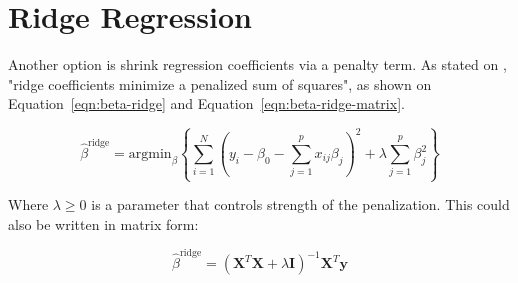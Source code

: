 \section{Ridge Regression}
\label{sec:ridge}

Another option is shrink regression coefficients via a penalty term. As stated on \cite{friedman2001}, "ridge coefficients minimize a penalized sum of squares", as shown on Equation~\ref{eqn:beta-ridge} and Equation~\ref{eqn:beta-ridge-matrix}.

\begin{equation}
	\label{eqn:beta-ridge}
	\hat{\beta}^{\text{ridge}} = \text{argmin}_\beta \left\{ \sum_{i=1}^{N}(y_i - \beta_0 - \sum_{j=1}^{p} x_{ij}\beta_j)^2 + \lambda \sum_{j=1}^{p} \beta_j^2 \right\}
\end{equation}

Where $\lambda \geq 0$ is a parameter that controls strength of the penalization. This could also be written in matrix form:

\begin{equation}
	\label{eqn:beta-ridge-matrix}
	\hat{\beta}^{\text{ridge}} = (\mathbf{X}^T \mathbf{X} + \lambda \mathbf{I})^{-1} \mathbf{X}^T\mathbf{y}
\end{equation}



